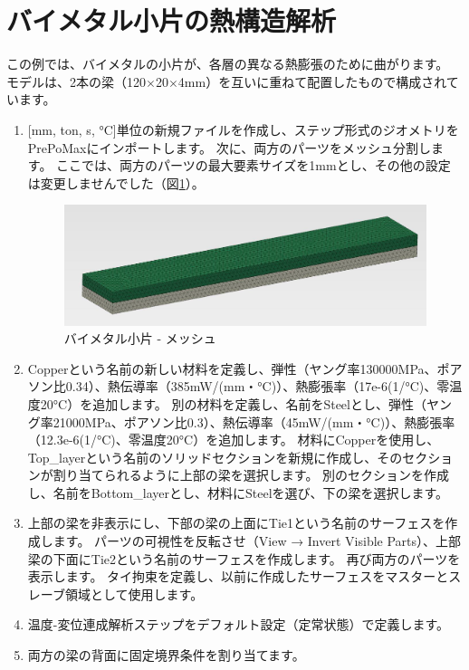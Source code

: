 \section{バイメタル小片の熱構造解析}
この例では、バイメタルの小片が、各層の異なる熱膨張のために曲がります。
モデルは、2本の梁（120$\times$20$\times$4mm）を互いに重ねて配置したもので構成されています。
\begin{enumerate}
\item
  {[}mm, ton, s, °C{]}単位の新規ファイルを作成し、ステップ形式のジオメトリをPrePoMaxにインポートします。
  次に、両方のパーツをメッシュ分割します。
  ここでは、両方のパーツの最大要素サイズを1mmとし、その他の設定は変更しませんでした（図\ref{fig:12-01}）。
	\begin{figure}[H]
	\centering
	\includegraphics[width=145mm]{fig/12-01.png}
	\caption{バイメタル小片 - メッシュ}
	\label{fig:12-01}
	\end{figure}
	\vspace{-\baselineskip}
\item
  Copperという名前の新しい材料を定義し、弾性（ヤング率130000MPa、ポアソン比0.34）、熱伝導率（385mW/(mm・°C)）、熱膨張率（17e-6(1/°C)、零温度20°C）を追加します。
  別の材料を定義し、名前をSteelとし、弾性（ヤング率21000MPa、ポアソン比0.3）、熱伝導率（45mW/(mm・°C)）、熱膨張率（12.3e-6(1/°C)、零温度20°C）を追加します。
  材料にCopperを使用し、Top\_layerという名前のソリッドセクションを新規に作成し、そのセクションが割り当てられるように上部の梁を選択します。
  別のセクションを作成し、名前をBottom\_layerとし、材料にSteelを選び、下の梁を選択します。
\item
  上部の梁を非表示にし、下部の梁の上面にTie1という名前のサーフェスを作成します。
  パーツの可視性を反転させ（View → Invert Visible Parts）、上部梁の下面にTie2という名前のサーフェスを作成します。
  再び両方のパーツを表示します。
  タイ拘束を定義し、以前に作成したサーフェスをマスターとスレーブ領域として使用します。
\item
  温度-変位連成解析ステップをデフォルト設定（定常状態）で定義します。
\item
  両方の梁の背面に固定境界条件を割り当てます。

\end{enumerate}
